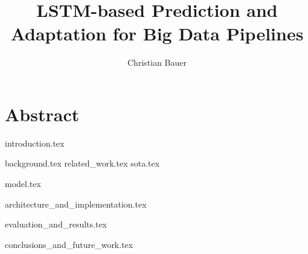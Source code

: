 \documentclass[
a4paper, %
11pt, %
onecolumn, %
openany, %
]{memoir}
\title{LSTM-based Prediction and Adaptation for Big Data Pipelines}
\author{Christian Bauer}
\begin{document}
  \maketitle

  \tableofcontents
  \listoffigures
  \lstlistoflistings

  \section*{Abstract}   


  {introduction.tex}

  {background.tex}
  {related_work.tex}
  {sota.tex}

  {model.tex}

  {architecture_and_implementation.tex}
  
  {evaluation_and_results.tex}

  {conclusions_and_future_work.tex}


  
  
\end{document}
